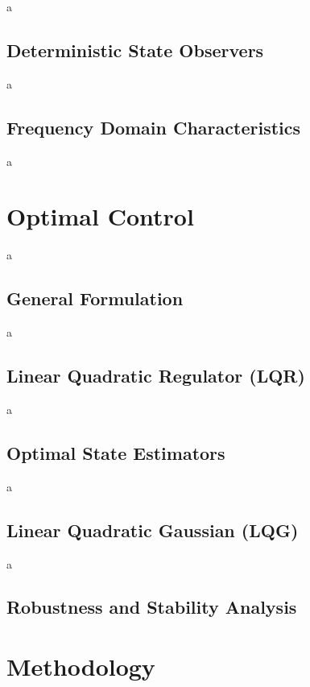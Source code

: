 \documentclass[a4paper,11pt]{book}
\numberwithin{figure}{chapter}
\numberwithin{equation}{chapter}
\numberwithin{table}{chapter}
\theoremstyle{definition}
\begin{document}
a

\section{Deterministic State Observers}

a

\section{Frequency Domain Characteristics}

a

\clearpage
\chapter{Optimal Control}

a

\section{General Formulation}

a

\section{Linear Quadratic Regulator (LQR)}

a

\section{Optimal State Estimators}

a

\section{Linear Quadratic Gaussian (LQG)}

a

\section{Robustness and Stability Analysis}


\clearpage
\chapter{Methodology}
\end{document}
